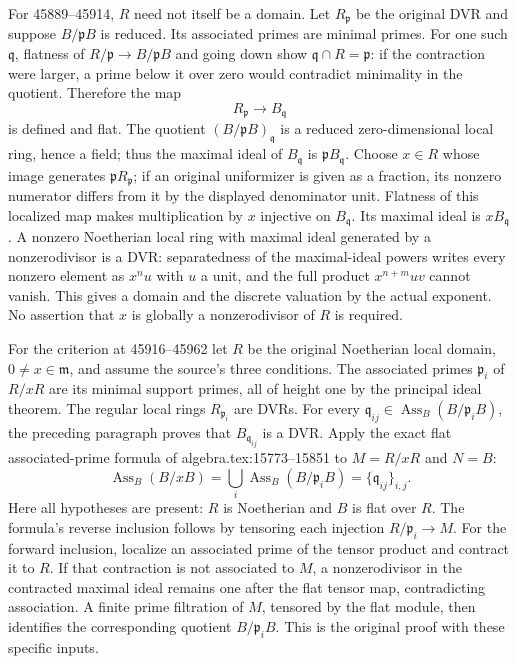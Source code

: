 For 45889--45914, \(R\) need not itself be a domain. Let \(R_{\mathfrak p}\) be the original DVR and suppose \(B/\mathfrak pB\) is reduced. Its associated primes are minimal primes. For one such \(\mathfrak q\), flatness of \(R/\mathfrak p\to B/\mathfrak pB\) and going down show \(\mathfrak q\cap R=\mathfrak p\): if the contraction were larger, a prime below it over zero would contradict minimality in the quotient. Therefore the map \[
 R_{\mathfrak p}\longrightarrow B_{\mathfrak q}
\] is defined and flat. The quotient \((B/\mathfrak pB)_{\mathfrak q}\) is a reduced zero-dimensional local ring, hence a field; thus the maximal ideal of \(B_{\mathfrak q}\) is \(\mathfrak pB_{\mathfrak q}\). Choose \(x\in R\) whose image generates \(\mathfrak pR_{\mathfrak p}\); if an original uniformizer is given as a fraction, its nonzero numerator differs from it by the displayed denominator unit. Flatness of this localized map makes multiplication by \(x\) injective on \(B_{\mathfrak q}\). Its maximal ideal is \(xB_{\mathfrak q}\). A nonzero Noetherian local ring with maximal ideal generated by a nonzerodivisor is a DVR: separatedness of the maximal-ideal powers writes every nonzero element as \(x^n u\) with \(u\) a unit, and the full product \(x^{n+m}uv\) cannot vanish. This gives a domain and the discrete valuation by the actual exponent. No assertion that \(x\) is globally a nonzerodivisor of \(R\) is required.

For the criterion at 45916--45962 let \(R\) be the original Noetherian local domain, \(0\ne x\in\mathfrak m\), and assume the source's three conditions. The associated primes \(\mathfrak p_i\) of \(R/xR\) are its minimal support primes, all of height one by the principal ideal theorem. The regular local rings \(R_{\mathfrak p_i}\) are DVRs. For every \(\mathfrak q_{ij}\in\operatorname{Ass}_B(B/\mathfrak p_iB)\), the preceding paragraph proves that \(B_{\mathfrak q_{ij}}\) is a DVR. Apply the exact flat associated-prime formula of algebra.\AlgebraIdentifierBreak{}tex:\AlgebraIdentifierBreak{}15773--\AlgebraIdentifierBreak{}15851 to \(M=R/xR\) and \(N=B\): \[
 \operatorname{Ass}_B(B/xB)
 =\bigcup_i\operatorname{Ass}_B(B/\mathfrak p_iB)
 =\{\mathfrak q_{ij}\}_{i,j}.
\] Here all hypotheses are present: \(R\) is Noetherian and \(B\) is flat over \(R\). The formula's reverse inclusion follows by tensoring each injection \(R/\mathfrak p_i\to M\). For the forward inclusion, localize an associated prime of the tensor product and contract it to \(R\). If that contraction is not associated to \(M\), a nonzerodivisor in the contracted maximal ideal remains one after the flat tensor map, contradicting association. A finite prime filtration of \(M\), tensored by the flat module, then identifies the corresponding quotient \(B/\mathfrak p_iB\). This is the original proof with these specific inputs.

